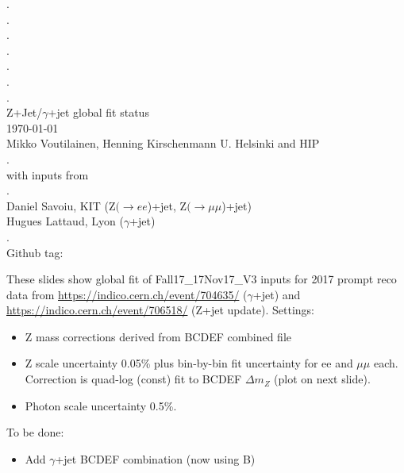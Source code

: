 \documentclass[landscape,10pt]{beamer} %
\begin{document}
\begin{centering}
{. }\\
{. }\\
{. }\\
{. }\\
{. }\\
{. }\\
{. }\\
Z+Jet/$\gamma$+jet global fit status\\
\today\\
Mikko Voutilainen, Henning Kirschenmann
U. Helsinki and HIP\\
.\\
with inputs from\\
.\\
Daniel Savoiu, KIT (Z$(\rightarrow ee$)+jet, Z$(\rightarrow \mu\mu$)+jet)\\
Hugues Lattaud, Lyon ($\gamma$+jet)\\
.\\
Github tag: \\
\end{centering}
\newpage

These slides show global fit of Fall17\_17Nov17\_V3 inputs for 2017 prompt reco data from \url{https://indico.cern.ch/event/704635/} ($\gamma$+jet) and \url{https://indico.cern.ch/event/706518/} (Z+jet update). Settings:
\begin{itemize}
\item Z mass corrections derived from BCDEF combined file
\item Z scale uncertainty 0.05\% plus bin-by-bin fit uncertainty for ee and $\mu\mu$ each. Correction is quad-log (const) fit to BCDEF $\Delta m_Z$ (plot on next slide).
\item Photon scale uncertainty 0.5\%.
\end{itemize}

To be done:
\begin{itemize}
\item Add $\gamma$+jet BCDEF combination (now using B)
\end{itemize}
\end{document}
